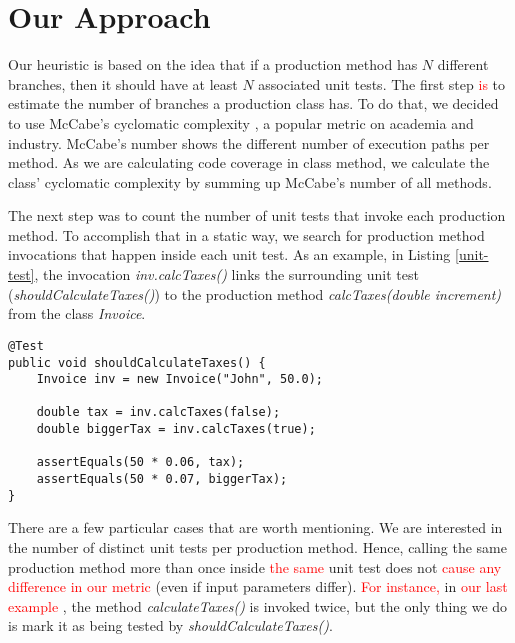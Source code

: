 \documentclass{sig-alternate}
\begin{document}
\section{ Our Approach}
\label{sec-heuristic}

Our heuristic is based on the idea that if a production method has $N$ different branches, then it should
have at least $N$ associated unit tests.  The first step  \textcolor{red}{is} to estimate the number of branches 
a production class has. To do that, we decided to use McCabe's cyclomatic complexity \cite{mccabe}, a popular
metric on academia and industry.
McCabe's number  shows the different number of execution paths per method. 
As we are calculating code coverage in class method, we calculate the class' cyclomatic complexity
by summing up McCabe's number of all methods.

The next step was to count the number of unit tests that invoke each production method. To accomplish that
in a static way, we search for production method invocations that happen inside each unit test. As an example, in Listing
\ref{unit-test}, the invocation \textit{inv.calcTaxes()} links the surrounding unit test (\textit{shouldCalculateTaxes()}) to 
the production method \textit{calcTaxes(double increment)} from the class \textit{Invoice}.

\begin{lstlisting}
@Test
public void shouldCalculateTaxes() {
	Invoice inv = new Invoice("John", 50.0);

	double tax = inv.calcTaxes(false);
	double biggerTax = inv.calcTaxes(true);
		
	assertEquals(50 * 0.06, tax);
	assertEquals(50 * 0.07, biggerTax);
}
\end{lstlisting}

There are a few particular cases that are worth mentioning. We are interested in the number 
of distinct unit tests per production method. Hence, calling the same production method
more than once inside \textcolor{red}{the same} unit test does not \textcolor{red}{cause any difference in our metric}
 (even if input parameters differ). \textcolor{red}{For instance,} in \textcolor{red}{our last example} , the 
method \textit{calculateTaxes()} is invoked twice, but the only thing we do is mark it 
as being tested by \textit{shouldCalculateTaxes()}.
\end{document}
